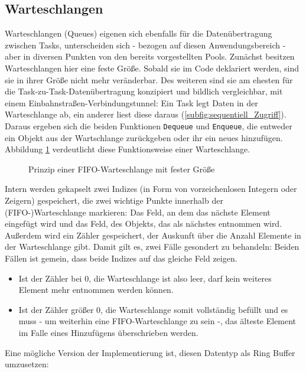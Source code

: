 \documentclass{llncs}
\begin{document}
\subsection{Warteschlangen}
Warteschlangen (Queues) eigenen sich ebenfalls für die Datenübertragung zwischen Tasks, unterscheiden sich - bezogen auf diesen Anwendungsbereich - aber in diversen Punkten von den bereits vorgestellten Pools. Zunächst besitzen Warteschlangen hier eine feste Größe. Sobald sie im Code deklariert werden, sind sie in ihrer Größe nicht mehr veränderbar. Des weiteren sind sie am ehesten für die Task-zu-Task-Datenübertragung konzipiert und bildlich vergleichbar, mit einem Einbahnstraßen-Verbindungstunnel: Ein Task legt Daten in der Warteschlange ab, ein anderer liest diese daraus (\ref{subfig:sequentiell_Zugriff}). Daraus ergeben sich die beiden Funktionen \texttt{Dequeue} und \texttt{Enqueue}, die entweder ein Objekt aus der Wartschlange zurückgeben oder ihr ein neues hinzufügen.\\
Abbildung \ref{fig:Queue} verdeutlicht diese Funktionsweise einer Warteschlange.
\begin{figure}
	\centering
	\def\svgwidth{\columnwidth}
	\caption{\label{fig:Queue}Prinzip einer FIFO-Warteschlange mit fester Größe \autocite[vgl.][97]{Cooling2017}}
\end{figure}
Intern werden gekapselt zwei Indizes (in Form von vorzeichenlosen Integern oder Zeigern) gespeichert, die zwei wichtige Punkte innerhalb der (FIFO-)Warteschlange markieren: Das Feld, an dem das nächste Element eingefügt wird und das Feld, des Objekts, das als nächstes entnommen wird. Außerdem wird ein Zähler gespeichert, der Auskunft über die Anzahl Elemente in der Warteschlange gibt. Damit gilt es, zwei Fälle gesondert zu behandeln: Beiden Fällen ist gemein, dass beide Indizes auf das gleiche Feld zeigen. 
\begin{itemize}
	\item Ist der Zähler bei 0, die Warteschlange ist also leer, darf kein weiteres Element mehr entnommen werden können.
	\item Ist der Zähler größer 0, die Warteschlange somit vollständig befüllt und es muss - um weiterhin eine FIFO-Warteschlange zu sein -, das älteste Element im Falle eines Hinzufügens überschrieben werden.
\end{itemize}

Eine mögliche Version der Implementierung ist, diesen Datentyp als Ring Buffer umzusetzen: 
\end{document}
